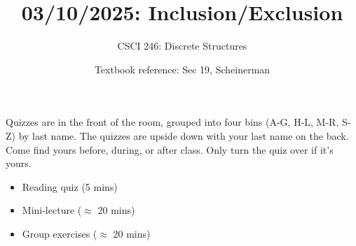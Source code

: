 \documentclass[10pt]{beamer}
\begin{document}






\title{03/10/2025: Inclusion/Exclusion}
\author{CSCI 246: Discrete Structures}
\date{Textbook reference: Sec 19, Scheinerman}

\begin{frame}
    \titlepage 
\end{frame}


\begin{frame}
\footnotesize 
\begin{mygreenbox}[title=Graded Quiz Pickup]
Quizzes are in the front of the room, grouped into four bins (A-G, H-L, M-R, S-Z) by last name. The quizzes are upside down with your last name on the back. Come find yours before, during, or after class.  Only turn the quiz over if it's yours.
\end{mygreenbox} 
\vfill 


\vfill 


\begin{myyellowbox}[title=Today's Agenda]
\begin{itemize}
	\item Reading quiz (5 mins)
	\item Mini-lecture ($\approx$ 20 mins)
	\item Group exercises ($\approx$ 20 mins)
\end{itemize}

%	
\end{myyellowbox}
\vfill 

\end{frame}
\end{document}
